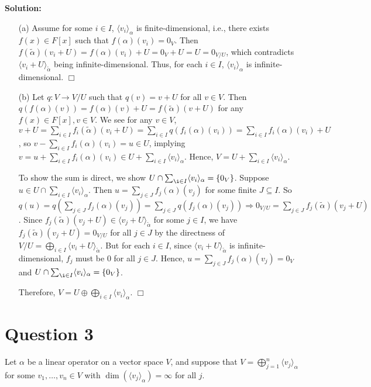 \documentclass[12pt]{article}
\begin{document}
\noindent \textbf{Solution:}
\begin{enumerate}
    \item[(a)] Assume for some $i \in I$, $\langle v_i \rangle_\alpha$ is finite-dimensional, i.e., there exists $f(x) \in F[x]$ such that $f(\alpha)(v_i) = 0_V$. Then $f(\widetilde{\alpha})(v_i + U) = f(\alpha)(v_i) + U = 0_V + U = U = 0_{V/U}$, which contradicts $\langle v_i + U \rangle_{\widetilde{\alpha}}$ being infinite-dimensional. Thus, for each $i \in I$, $\langle v_i \rangle_\alpha$ is infinite-dimensional. \hfill $\Box$
    \item[(b)] Let $q : V \to V/U$ such that $q(v) = v + U$ for all $v \in V$. Then $q(f(\alpha)(v)) = f(\alpha)(v) + U = f(\widetilde{\alpha})(v + U)$ for any $f(x) \in F[x], v \in V$. We see for any $v \in V$, $v + U = \sum_{i \in I} f_i(\widetilde{\alpha})(v_i + U) = \sum_{i \in I} q(f_i(\alpha)(v_i)) = \sum_{i \in I} f_i(\alpha)(v_i) + U$, so $v - \sum_{i \in I} f_i(\alpha)(v_i) = u \in U$, implying $v = u + \sum_{i \in I} f_i(\alpha)(v_i) \in U + \sum_{i \in I} \langle v_i \rangle_\alpha$. Hence, $V = U + \sum_{i \in I} \langle v_i \rangle_\alpha$.
    
    \noindent To show the sum is direct, we show $U \cap \sum_{\i \in I} \langle v_i \rangle_\alpha = \{0_V\}$. Suppose $u \in U \cap \sum_{i \in I} \langle v_i \rangle_\alpha$. Then $u = \sum_{j \in J} f_j(\alpha)(v_j)$ for some finite $J \subseteq I$. So $q(u) = q(\sum_{j \in J} f_j(\alpha)(v_j)) = \sum_{j \in J} q(f_j(\alpha)(v_j)) \Rightarrow 0_{V/U} = \sum_{j \in J} f_j(\widetilde{\alpha})(v_j + U)$. Since $f_j(\widetilde{\alpha})(v_j + U) \in \langle v_j + U\rangle_{\widetilde{\alpha}}$ for some $j \in I$, we have $f_j(\widetilde{\alpha})(v_j + U) = 0_{V/U}$ for all $j \in J$ by the directness of $V/U = \bigoplus_{i \in I} \langle v_i + U \rangle_{\widetilde{\alpha}}$. But for each $i \in I$, since $\langle v_i + U \rangle_{\widetilde{\alpha}}$ is infinite-dimensional, $f_j$ must be $0$ for all $j \in J$. Hence, $u = \sum_{j \in J} f_j(\alpha)(v_j) = 0_V$ and $U \cap \sum_{\i \in I} \langle v_i \rangle_\alpha = \{0_V\}$. 
    
    \noindent Therefore, $V = U \oplus \bigoplus_{i \in I} \langle v_i \rangle_{\alpha}$. \hfill $\Box$
\end{enumerate}

\newpage

\section*{Question 3}
Let \(\alpha\) be a linear operator on a vector space \(V\), and suppose that 
$V = \bigoplus_{j=1}^n \langle v_j \rangle_\alpha$ for some \(v_1, \ldots, v_n \in V\) with \(\dim(\langle v_j \rangle_\alpha) = \infty\) for all \(j\).
\end{document}
